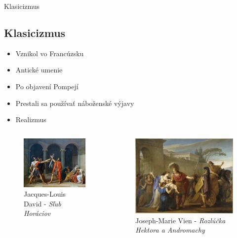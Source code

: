 \documentclass[dvipsnames]{beamer}
\begin{document}
\begin{frame}{Klasicizmus}
	\subsection{Klasicizmus}
	\begin{itemize}
		\item Vznikol vo Francúzsku
		\item Antické umenie
		\item Po objavení Pompejí
		\item Prestali sa používať náboženské výjavy
		\item Realizmus
	\end{itemize}
	\begin{columns}
		\kern0pt
		\begin{figure}
			\includegraphics[scale=0.5]{horac}
			\caption{\textcolor{BurntOrange}{Jacques-Louis David} - \textit{Sľub Horáciov}}
		\end{figure}%
		\begin{figure}
			\includegraphics[scale=1.25]{og}
			\vskip 1mm
			\caption{\centering \textcolor{BurntOrange}{Joseph-Marie Vien} - \textit{Rozlúčka Hektora a Andromachy}}
		\end{figure}%

	\end{columns}
\end{frame}
\end{document}
